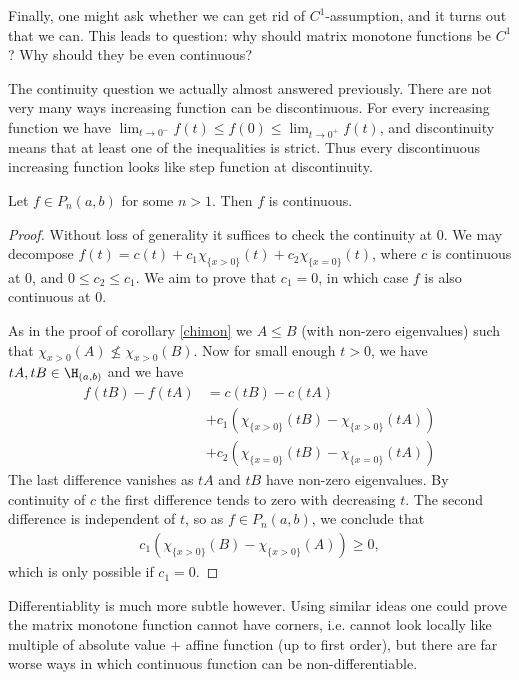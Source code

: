 Finally, one might ask whether we can get rid of $C^{1}$-assumption, and it turns out that we can. This leads to question: why should matrix monotone functions be $C^{1}$? Why should they be even continuous?

The continuity question we actually almost answered previously. There are not very many ways increasing function can be discontinuous. For every increasing function we have $\lim_{t \to 0^{-}} f(t) \leq f(0) \leq \lim_{t \to 0^{+}} f(t)$, and discontinuity means that at least one of the inequalities is strict. Thus every discontinuous increasing function looks like step function at discontinuity.

\begin{lem}
	Let $f \in P_{n}(a, b)$ for some $n > 1$. Then $f$ is continuous.
\end{lem}
\begin{proof}
	Without loss of generality it suffices to check the continuity at $0$. We may decompose $f(t) = c(t) +  c_{1} \chi_{\{x > 0\}}(t) + c_{2} \chi_{\{x = 0\}}(t)$, where $c$ is continuous at $0$, and $0 \leq c_{2} \leq c_{1}$. We aim to prove that $c_{1} = 0$, in which case $f$ is also continuous at $0$.

	As in the proof of corollary \ref{chimon} we $A \leq B$ (with non-zero eigenvalues) such that $\chi_{x > 0}(A) \not\leq \chi_{x > 0}(B)$. Now for small enough $t > 0$, we have $t A, t B \in \H_{(a, b)}$ and we have
	\begin{align*}
		f(t B) - f(t A) &= c(t B) - c(t A) \\
		&+ c_{1} \left(\chi_{\{x > 0\}}(t B) - \chi_{\{x > 0\}}(t A)\right) \\
		&+ c_{2} \left(\chi_{\{x = 0\}}(t B) - \chi_{\{x = 0\}}(t A) \right)
	\end{align*}
	The last difference vanishes as $t A$ and $t B$ have non-zero eigenvalues. By continuity of $c$ the first difference tends to zero with decreasing $t$. The second difference is independent of $t$, so as $f \in P_{n}(a, b)$, we conclude that
	\begin{align*}
		c_{1} \left(\chi_{\{x > 0\}}(B) - \chi_{\{x > 0\}}(A)\right) \geq 0,
	\end{align*}
	which is only possible if $c_{1} = 0$.
\end{proof}

Differentiablity is much more subtle however. Using similar ideas one could prove the matrix monotone function cannot have corners, i.e. cannot look locally like multiple of absolute value $+$ affine function (up to first order), but there are far worse ways in which continuous function can be non-differentiable.

